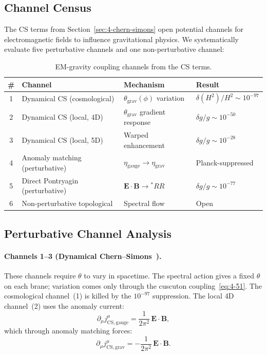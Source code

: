 \subsection{Channel Census}
\label{sec:4-channel-census}

The CS terms from Section~\ref{sec:4-chern-simons} open potential channels for electromagnetic fields to influence gravitational physics. We systematically evaluate five perturbative channels and one non-perturbative channel:

\begin{table}[htbp]
\centering
\caption{EM-gravity coupling channels from the CS terms.}
\label{tab:4-2}
\begin{tabular}{@{}clll@{}}
\toprule
\# & Channel & Mechanism & Result \\
\midrule
1 & Dynamical CS (cosmological)     & $\theta_{\mathrm{grav}}(\phi)$ variation   & $\delta(H^2)/H^2 \sim 10^{-97}$ \\
2 & Dynamical CS (local, 4D)        & $\theta_{\mathrm{grav}}$ gradient response & $\delta g/g \sim 10^{-50}$ \\
3 & Dynamical CS (local, 5D)        & Warped enhancement              & $\delta g/g \sim 10^{-28}$ \\
4 & Anomaly matching (perturbative) & $\eta_{\mathrm{gauge}} \to \eta_{\mathrm{grav}}$ & Planck-suppressed \\
5 & Direct Pontryagin (perturbative)& $\mathbf{E}\cdot\mathbf{B} \to {}^*\!RR$ & $\delta g/g \sim 10^{-77}$ \\
6 & Non-perturbative topological    & Spectral flow                   & Open \\
\bottomrule
\end{tabular}
\end{table}


\subsection{Perturbative Channel Analysis}
\label{sec:4-perturbative}

\paragraph{Channels 1--3 (Dynamical Chern--Simons~\cite{ch4:AlexanderYunes2009,ch4:JackiwPi2003}).}
These channels require $\theta$ to vary in spacetime. The spectral action gives a fixed $\theta$ on each brane; variation comes only through the cuscuton coupling~\eqref{eq:4-51}. The cosmological channel~(1) is killed by the $10^{-97}$ suppression. The local 4D channel~(2) uses the anomaly current:
\begin{equation}
  \partial_\mu j^\mu_{\mathrm{CS,gauge}}
  = \frac{1}{2\pi^2}\, \mathbf{E} \cdot \mathbf{B},
  \label{eq:4-54}
\end{equation}
which through anomaly matching forces:
\begin{equation}
  \partial_\mu j^\mu_{\mathrm{CS,grav}}
  = -\frac{1}{2\pi^2}\, \mathbf{E} \cdot \mathbf{B}.
  \label{eq:4-55}
\end{equation}

